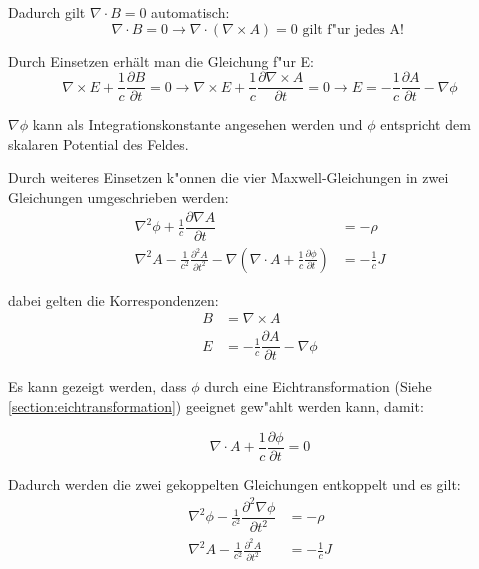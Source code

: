 Dadurch gilt $\nabla \cdot B = 0 $ automatisch:
\begin{equation}
\nabla \cdot B = 0 \rightarrow \nabla \cdot ( \nabla\times A ) = 0 \text{ gilt f"ur jedes A! }
\end{equation}

Durch Einsetzen erhält man die Gleichung f"ur E:
\begin{equation}
\nabla\times E + \frac{1}{c} \frac{\partial B }{\partial t} = 0
\rightarrow \nabla\times E + \frac{1}{c} \frac{\partial \nabla\times A }{\partial t} = 0 \rightarrow E = -\frac{1}{c} \dfrac{\partial A}{\partial t} - \nabla \phi
\end{equation}

$\nabla \phi$ kann als Integrationskonstante angesehen werden und $\phi$ entspricht dem skalaren Potential des Feldes.

Durch weiteres Einsetzen k"onnen die vier Maxwell-Gleichungen in zwei Gleichungen umgeschrieben werden:
\begin{equation}
\begin{split}
 \nabla^2 \phi + \frac{1}{c} \dfrac{\partial \nabla A}{\partial t} &= -\rho \\
 \nabla^2 A - \frac{1}{c^2} \frac{\partial^2 A }{\partial t^2} - \nabla \left( \nabla \cdot A + \frac{1}{c} \frac{\partial \phi }{\partial t} \right) &= - \frac{1}{c} J
\end{split}
\end{equation}

dabei gelten die Korrespondenzen:
\begin{equation}
\begin{split}
B &= \nabla\times A \\
E &= -\frac{1}{c} \dfrac{\partial A}{\partial t} - \nabla \phi
\end{split}
\end{equation}

Es kann gezeigt werden, dass $\phi$ durch eine Eichtransformation (Siehe \ref{section:eichtransformation}) geeignet gew"ahlt werden kann, damit:

\begin{equation}
\nabla \cdot A + \frac{1}{c} \frac{\partial \phi }{\partial t} = 0
\end{equation}

Dadurch werden die zwei gekoppelten Gleichungen entkoppelt und es gilt:
\begin{equation}
\begin{split}
\nabla^2 \phi - \frac{1}{c^2} \dfrac{\partial^2 \nabla \phi}{\partial t^2} &= -\rho \\
\nabla^2 A - \frac{1}{c^2} \frac{\partial^2 A }{\partial t^2} &= - \frac{1}{c} J
\end{split}
\end{equation}

